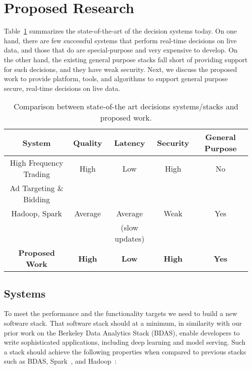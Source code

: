 \section{Proposed Research}
\label{sec:research}

Table~\ref{table:new-work} summarizes the state-of-the-art of the decision systems today. On one hand, there are few successful systems that perform real-time decisions on live data, and those that do are special-purpose and very expensive to develop. On the other hand, the existing general purpose stacks fall short of providing support for such decisions, and they have weak security. Next, we discuss the proposed work to provide platform, tools, and algorithms to support general purpose secure, real-time decisions on live data.  


\begin{table}[h]
\begin{center}
{\small
\begin{tabular}{ |c|c|c|c|c| } 
 \hline
{\bf System} & {\bf Quality} & {\bf Latency} & {\bf Security} & {\bf General Purpose}\\\hline 
High Frequency Trading & High & Low & High & No \\
Ad Targeting \& Bidding & & & & \\\hline
Hadoop, Spark & Average & Average & Weak & Yes\\
                         &               & (slow updates) & & \\\hline
{\bf Proposed Work} & {\bf High} & {\bf Low} & {\bf High} & {\bf Yes} \\\hline
\end{tabular}
}
\end{center}
\vskip -0.15in
\caption{\small{Comparison between state-of-the art decisions systems/stacks and proposed work.}}
\label{table:new-work}
\end{table}


\subsection{Systems}

To meet the performance and the functionality targets we need to build a new software stack. That software stack should at a minimum, in similarity with our prior work on the Berkeley Data Analytics Stack (BDAS), enable developers to write sophisticated applications, including deep learning and model serving. Such a stack should achieve the following properties when compared to previous stacks such as BDAS, Spark~\cite{spark}, and Hadoop~\cite{murthy2011architecture}:

